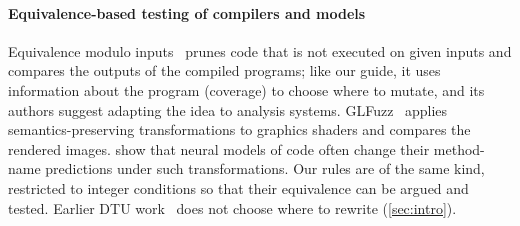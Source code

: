 \paragraph{Equivalence-based testing of compilers and models}
Equivalence modulo inputs~\citep{le2014emi} prunes code that is not executed on
given inputs and compares the outputs of the compiled programs; like our
guide, it uses information about the program (coverage) to choose where to
mutate, and its authors suggest adapting the idea to analysis systems. GLFuzz~\citep{donaldson2017} applies
semantics-preserving transformations to graphics shaders and compares the
rendered images. \citet{rabin2021} show that neural models of code
often change their method-name predictions under such transformations. Our
rules are of the same kind, restricted to integer conditions so that their
equivalence can be argued and tested. Earlier DTU
work~\citep{chand2024,domingues2025} does not choose where to rewrite
(\cref{sec:intro}).

